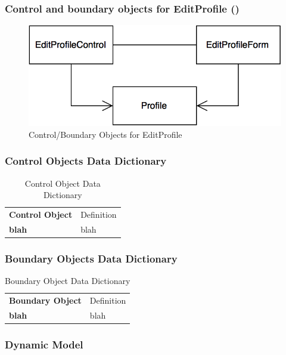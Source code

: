 \documentclass[12pt,letterpaper]{article}
\begin{document}
\subsubsection*{Control and boundary objects for EditProfile (\editprofile{})}
\begin{figure}[H]
	\centering{}
	\includegraphics[scale=0.4]{imgs/cbod/edit-profile.png}
	\caption{Control/Boundary Objects for EditProfile}
\end{figure}

\subsubsection*{Control Objects Data Dictionary}

\begin{table}[H]
\caption{Control Object Data Dictionary}
	\begin{tabu} to 
		\tableheader{}Control Object & Definition\\
		blah & blah\\
		
	\end{tabu}
\end{table}

\subsubsection*{Boundary Objects Data Dictionary}

\begin{table}[H]
\caption{Boundary Object Data Dictionary}
	\begin{tabu} to 
		\tableheader{}Boundary Object & Definition\\
		blah & blah\\
		
	\end{tabu}
\end{table}

\subsubsection{Dynamic Model}
\end{document}

